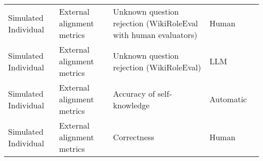 \begin{small}
\begin{center}
\begin{longtable}{@{}p{}p{}p{}p{}p{}@{}}
Simulated Individual     & External alignment metrics          & Unknown question rejection (WikiRoleEval with human evaluators)                                                                                                                                             & Human     & \cite{tang2024erabalenhancingroleplayingagents}                                                                                                                                                                                                                                                                                                                                                                                              \\
Simulated Individual     & External alignment metrics          & Unknown question rejection (WikiRoleEval)                                                                                                                                                                   & LLM       & \cite{tang2024erabalenhancingroleplayingagents}                                                                                                                                                                                                                                                                                                                                                                                              \\
Simulated Individual     & External alignment metrics          & Accuracy of self-knowledge                                                                                                                                                                                  & Automatic & \cite{liu2024roleagent}                                                                                                                                                                                                                                                                                                                                                                                           \\
Simulated Individual     & External alignment metrics          & Correctness                                                                                                                                                                                                 & Human     & \cite{Zhang2024SpeechAgentsHS}                                                                                                                                                                                                                                                                                                                                                                                                   \\

\end{longtable}
\end{center}
\end{small}
